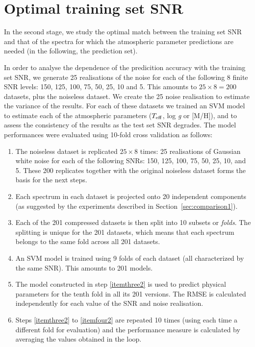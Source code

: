 \documentclass[a4paper,fleqn,usenatbib]{mnras}
\begin{document}
{{{%
\section{Optimal training set SNR}
\label{sec:comparison2}

In the second stage, we study the optimal match between the training
set SNR and that of the spectra for which the atmospheric parameter
predictions are needed (in the following, the prediction set).

In order to analyse the dependence of the predicition accuracy with
the training set SNR, we generate 25 realisations of the noise for
each of the following 8 finite SNR levels: 150, 125, 100, 75, 50, 25,
10 and 5. This amounts to $25\times 8=200$ datasets, plus the
noiseless dataset. We create the 25 noise realisation to estimate the
variance of the results. For each of these datasets we trained an SVM
model to estimate each of the atmospheric parameters ($T_{\rm
  eff}$, log \textit{g} or [M/H]), and to assess the consistency of
the results as the test set SNR degrades. The model performances were
evaluated using 10-fold cross validation as follows:

\begin{enumerate}
\item The noiseless dataset is replicated $25\times 8$ times: 25
  realisations of Gaussian white noise for each of the following SNRs:
  150, 125, 100, 75, 50, 25, 10, and 5. These 200 replicates together
  with the original noiseless dataset forms the basis for the next
  steps.
\item Each spectrum in each dataset is projected onto 20 independent
  components (as suggested by the experiments described in
  Section~\ref{sec:comparison1}).
\item Each of the 201 compressed datasets is then split into 10
  subsets or \textit{folds}. The splitting is unique for the 201
  datasets, which means that each spectrum belongs to the same fold
  across all 201 datasets.
\item \label{itemthree2} An SVM model is trained using 9 folds of each
  dataset (all characterized by the same SNR). This amounts to 201
  models.
\item \label{itemfour2} The model constructed in step \ref{itemthree2}
  is used to predict physical parameters for the tenth fold in all its
  201 versions. The RMSE is calculated independently for each value of
  the SNR and noise realisation.
\item \label{itemfive2} Steps \ref{itemthree2} to \ref{itemfour2} are
  repeated 10 times (using each time a different fold for evaluation)
  and the performance measure is calculated by averaging the values
  obtained in the loop.
\end{enumerate}

}}}
\end{document}
